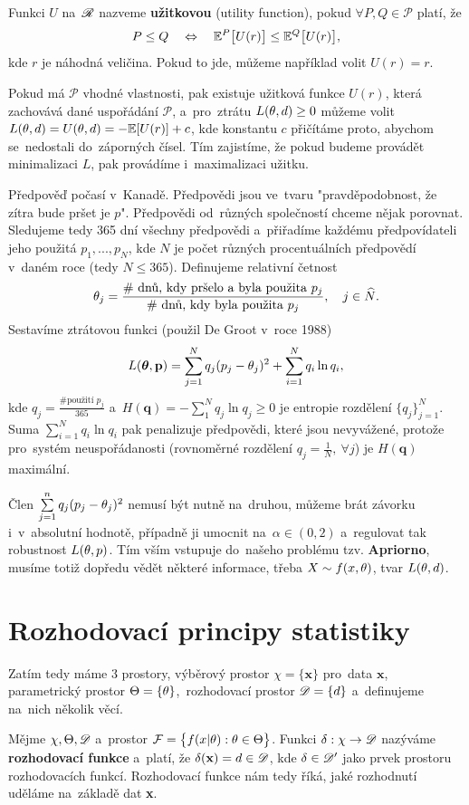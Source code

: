 \begin{define}
	Funkci $U$ na~$\mathscr{R}$ nazveme \textbf{užitkovou} (utility function), pokud $\forall P,Q\in\mathcal{P}$ platí, že 
	$$ P\leq Q\quad\Leftrightarrow\quad\mathbb{E}^P\big[U(r)\big]\leq\mathbb{E}^Q\big[U(r)\big],$$ kde $r$ je náhodná veličina. Pokud to jde, můžeme například volit $U(r)=r$.
\end{define}
\begin{remark}
	Pokud má $\mathcal{P}$ vhodné vlastnosti, pak existuje užitková funkce $U(r)$, která zachovává dané uspořádání $\mathcal{P}$, a~pro~ztrátu $L(\theta,d)\geq 0$ můžeme volit $L(\theta,d)=U(\theta,d)=-\mathbb{E}[U(r)]+c$, kde konstantu $c$ přičítáme proto, abychom se~nedostali do~záporných čísel. Tím zajistíme, že pokud budeme provádět minimalizaci $L$, pak provádíme i~maximalizaci užitku.
\end{remark}
\begin{example}[volba L]
	Předpověď počasí v~Kanadě. Předpovědi jsou ve~tvaru "pravděpodobnost, že zítra bude pršet je $p$". Předpovědi od~různých společností chceme nějak porovnat. Sledujeme tedy 365 dní všechny předpovědi a~přiřadíme každému předpovídateli jeho použitá $p_1,...,p_N$, kde $N$ je počet různých procentuálních předpovědí v~daném roce (tedy $N\leq 365$). Definujeme relativní četnost $$\theta_j=\frac{\text{\# dnů, kdy pršelo a~byla použita }p_j}{\text{\# dnů, kdy byla použita }p_j},\quad j\in\widehat{N}.$$ Sestavíme ztrátovou funkci (použil De Groot v~roce 1988) $$L(\boldsymbol{\theta},\textbf{p})=\sum_{j=1}^N q_j(p_j-\theta_j)^2+\sum_{i=1}^N q_i\ln q_i,$$ kde $q_j=\frac{\text{\# použití }p_j}{365}$ a~$H(\textbf{q})=-\sum_1^N q_j\ln q_j\geq 0$ je entropie rozdělení $\{q_j\}_{j=1}^N$. Suma $\sum_{i=1}^N q_i\ln q_i$ pak penalizuje předpovědi, které jsou nevyvážené, protože pro~systém neuspořádanosti (rovnoměrné rozdělení $q_j=\frac{1}{N},~\forall j$) je $H(\textbf{q})$ maximální.
	
	Člen $\sum\limits_{j=1}^{n} q_j(p_j-\theta_j)^2$ nemusí být nutně na~druhou, můžeme brát závorku i~v~absolutní hodnotě, případně ji umocnit na~$\alpha\in(0,2)$ a~regulovat tak robustnost $L(\theta,p)$. Tím vším vstupuje do~našeho problému tzv. \textbf{Apriorno}, musíme totiž dopředu vědět některé informace, třeba $X\sim f(x,\theta)$, tvar $L(\theta,d)$. 
\end{example}

\chapter{Rozhodovací principy statistiky}

Zatím tedy máme 3 prostory, výběrový prostor $\chi= \{\textbf{x}\}$ pro~data $\textbf{x}$, parametrický prostor $\Theta=\{\theta\}$,~rozhodovací prostor $\mathscr{D}= \{d\}$ a~definujeme na~nich několik věcí.
\begin{define}
	Mějme $\chi,\Theta,\mathscr{D}$ a~prostor  $\mathcal{F}=\big\{ f(x|\theta):\theta\in\Theta \big\}$. Funkci $\delta:\chi\to\mathscr{D} $ nazýváme \textbf{rozhodovací funkce} a~platí, že $\delta(\textbf{x})=d\in\mathscr{D} $, kde $\delta\in\mathscr{D}'$ jako prvek prostoru rozhodovacích funkcí.  Rozhodovací funkce nám tedy říká, jaké rozhodnutí uděláme na~základě dat \textbf{x}.
\end{define}

